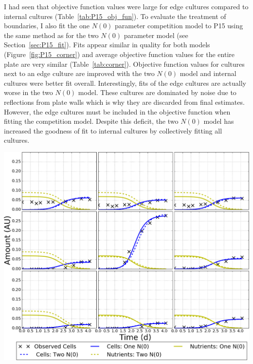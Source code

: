 \begin{multicols}{2}
I had seen that objective function values were large for edge cultures
compared to internal cultures (Table~\ref{tab:P15_obj_fun}). To
evaluate the treatment of boundaries, I also fit the one \(N(0)\)
parameter competition model to P15 using the same method as for the
two \(N(0)\) parameter model (see Section~\ref{sec:P15_fit}). Fits
appear similar in quality for both models
(Figure~\ref{fig:P15_corner}) and average objective function values
for the entire plate are very similar
(Table~\ref{tab:corner}). Objective function values for cultures next
to an edge culture are improved with the two \(N(0)\) model and
internal cultures were better fit overall. Interestingly, fits of the
edge cultures are actually worse in the two \(N(0)\) model. These
cultures are dominated by noise due to reflections from plate walls
which is why they are discarded from final estimates. However, the
edge cultures must be included in the objective function when fitting
the competition model. Despite this deficit, the two \(N(0)\) model
has increased the goodness of fit to internal cultures by collectively
fitting all cultures.


\graphicspath{{images/corners/}}
\begin{Figure}
  \centering
  \includegraphics[width=\linewidth]{final/top_left_new_aspect_2}
  \label{fig:P15_corner}
\end{Figure}



\end{multicols}
